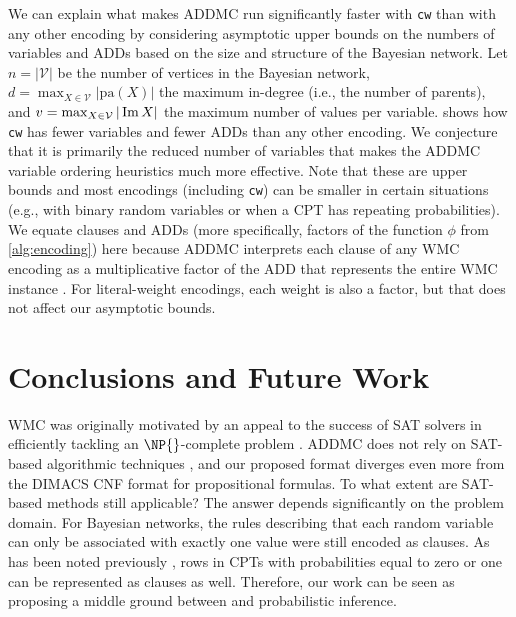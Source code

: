 We can explain what makes \textsc{ADDMC} \citep{DBLP:conf/aaai/DudekPV20} run
significantly faster with \texttt{cw} than with any other encoding by
considering asymptotic upper bounds on the numbers of variables and ADDs based
on the size and structure of the Bayesian network. Let $n = |\mathcal{V}|$ be
the number of vertices in the Bayesian network, $d = \max_{X \in \mathcal{V}}
|\mathrm{pa}(X)|$ the maximum in-degree (i.e., the number of parents), and $v =
\max_{X \in \mathcal{V}} |\operatorname{Im} X|$ the maximum number of values per variable.
 shows how \texttt{cw} has fewer variables and fewer ADDs
than any other encoding. We conjecture that it is primarily the reduced number
of variables that makes the \textsc{ADDMC} variable ordering heuristics much
more effective. Note that these are upper bounds and most encodings (including
\texttt{cw}) can be smaller in certain situations (e.g., with binary random
variables or when a CPT has repeating probabilities). We equate clauses and ADDs
(more specifically, factors of the function $\phi$ from \cref{alg:encoding})
here because \textsc{ADDMC} interprets each clause of any WMC encoding as a
multiplicative factor of the ADD that represents the entire WMC instance
\citep{DBLP:conf/aaai/DudekPV20}. For literal-weight encodings, each weight is
also a factor, but that does not affect our asymptotic bounds.

\section{Conclusions and Future Work}

WMC was originally motivated by an appeal to the success of SAT solvers in
efficiently tackling an $\NP{}$-complete problem
\citep{DBLP:conf/aaai/SangBK05}. \textsc{ADDMC} does not rely on SAT-based
algorithmic techniques \citep{DBLP:conf/aaai/DudekPV20}, and our proposed format
diverges even more from the DIMACS CNF format for propositional formulas. To
what extent are SAT-based methods still applicable? The answer depends
significantly on the problem domain. For Bayesian networks, the rules describing
that each random variable can only be associated with exactly one value were
still encoded as clauses. As has been noted previously
\citep{DBLP:conf/sat/ChaviraD06}, rows in CPTs with probabilities equal to zero
or one can be represented as clauses as well. Therefore, our work can be seen as
proposing a middle ground between \mc{} and probabilistic inference.

